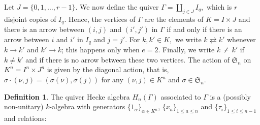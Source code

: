 \documentclass[11pt, reqno]{amsart} \textwidth=14.9cm \oddsidemargin=1cm \evensidemargin=1cm
\theoremstyle{definition}
\newtheorem{definition}[theorem]{Definition}
\def\nslash{\:\notslash\:}
\numberwithin{equation}{section}
\begin{document}
Let $J=\{0,1,\ldots,r-1\}$. We now define the quiver $\Gamma=\coprod_{j\in J} I_{q},$ which is $r$ disjoint copies of $I_{q}.$ Hence, the vertices of $\Gamma$ are the elements of $K=I\times J$ and there is an arrow between $(i, j)$ and $(i', j')$ in $\Gamma$ if and only if there is an arrow between $i$ and $i'$ in $I_{q}$ and $j=j'.$ For $k, k'\in K,$ we write $k\rightleftarrows k'$ whenever $k\rightarrow k'$ and $k'\rightarrow k$; this happens only when $e=2.$ Finally, we write $k\nslash k'$ if $k\neq k'$ and if there is no arrow between these two vertices. The action of $\mathfrak{S}_{n}$ on $K^{n}=I^{n}\times J^{n}$ is given by the diagonal action, that is, $\sigma\cdot(\nu, j)=(\sigma(\nu), \sigma(j))$ for any $(\nu, j)\in K^{n}$ and $\sigma\in \mathfrak{S}_{n}.$

\begin{definition}
The quiver Hecke algebra $H_{n}(\Gamma)$ associated to $\Gamma$ is a (possibly non-unitary) $k$-algebra with generators $\{1_{\alpha}\}_{\alpha\in K^{n}}$, $\{x_{a}\}_{1\leq a\leq n}$ and $\{\tau_{i}\}_{1\leq i\leq n-1}$ and relations:


\end{definition}
\end{document}
